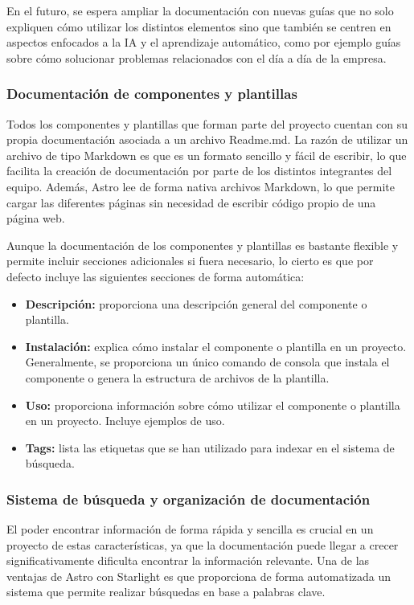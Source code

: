 En el futuro, se espera ampliar la documentación con nuevas guías
que no solo expliquen cómo utilizar los distintos elementos sino que
también se centren en aspectos enfocados a la IA y el aprendizaje
automático, como por ejemplo guías sobre cómo solucionar problemas
relacionados con el día a día de la empresa.

\subsubsection{Documentación de componentes y plantillas}
Todos los componentes y plantillas que forman parte del proyecto
cuentan con su propia documentación asociada a un archivo Readme.md.
La razón de utilizar un archivo de tipo Markdown es que es un formato
sencillo y fácil de escribir, lo que facilita la creación de documentación
por parte de los distintos integrantes del equipo. Además, Astro
lee de forma nativa archivos Markdown, lo que permite cargar las
diferentes páginas sin necesidad de escribir código propio de una
página web.\medskip

Aunque la documentación de los componentes y plantillas es bastante
flexible y permite incluir secciones adicionales si fuera necesario,
lo cierto es que por defecto incluye las siguientes secciones de forma
automática:

\begin{itemize}
    \item \textbf{Descripción:} proporciona una descripción general del
    componente o plantilla.
    \item \textbf{Instalación:} explica cómo instalar el componente o plantilla
    en un proyecto. Generalmente, se proporciona un único comando de consola que
    instala el componente o genera la estructura de archivos de la plantilla. 
    \item \textbf{Uso:} proporciona información sobre cómo utilizar el componente
    o plantilla en un proyecto. Incluye ejemplos de uso.
    \item \textbf{Tags:} lista las etiquetas que se han utilizado para indexar en
    el sistema de búsqueda.
\end{itemize}


\subsubsection{Sistema de búsqueda y organización de documentación}
El poder encontrar información de forma rápida y sencilla es crucial
en un proyecto de estas características, ya que la documentación
puede llegar a crecer significativamente dificulta encontrar
la información relevante. Una de las ventajas de Astro con Starlight
es que proporciona de forma automatizada un sistema que permite realizar 
búsquedas en base a palabras clave.\medskip

